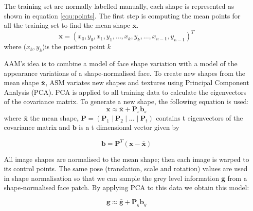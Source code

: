 The training set are normally labelled manually, each shape is represented as shown in equation \ref{equ:points}. The first step is computing the mean points for all the training set to find the mean shape $\boldsymbol{\bar{x}}$. 
\begin{equation}
\boldsymbol{x} = (x_0, y_0 , x_1, y_1,  ..., x_k, y_k, ..., x_{n-1}, y_{n-1})^T
    \label{equ:points}
\end{equation}
where $ (x_k, y_k$)is the position point $k$ 

AAM's idea is to combine a model of face shape variation with a model of the appearance variations of a shape-normalised face.
 To create new shapes from the mean shape $\boldsymbol{\bar{x}}$, ASM variates new shapes and textures using Principal Component Analysis (PCA). PCA is applied to all training data to calculate the eigenvectors of the covariance matrix. To generate a new shape, the following equation is used:
\begin{equation}
\boldsymbol{x} \approx \boldsymbol{\bar{x}} + \boldsymbol{P}_s \boldsymbol{b}_s
    \label{equ:NewShapes}
\end{equation}
where $\boldsymbol{\bar{x}}$ the mean shape, $\boldsymbol{P}= (\boldsymbol{P}_1 \mid \boldsymbol{P}_2\mid...\mid \boldsymbol{P}_t)$  contains t eigenvectors of the covariance matrix and $\boldsymbol{b}$ is a t dimensional vector given by

\begin{equation}
\boldsymbol{b} = \boldsymbol{P}^T (\boldsymbol{x-\bar{x}})
    \label{equ:points}
\end{equation}
 
 All image shapes are normalised to the mean shape; then each image is warped to its control points. The same pose (translation, scale and rotation) values are used in shape normalisation so that we can sample the grey level information $\boldsymbol{g}$ from a shape-normalised face patch. By applying PCA to this data we obtain this model:
 

\begin{equation}
\boldsymbol{g} \approx \boldsymbol{\bar{g}} + \boldsymbol{P}_g \boldsymbol{b}_g
    \label{equ:NewGreys}
\end{equation}

